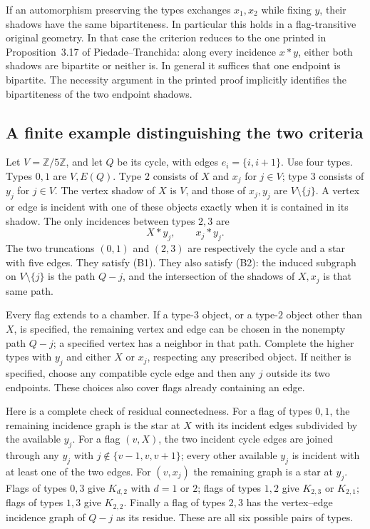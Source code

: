 \documentclass[11pt,a4paper]{article}
\begin{document}
If an automorphism preserving the types exchanges $x_1,x_2$ while
fixing $y$, their shadows have the same bipartiteness. In particular
this holds in a flag-transitive original geometry. In that case the
criterion reduces to the one printed in Proposition~3.17 of
Piedade--Tranchida: along every incidence $x*y$, either both shadows
are bipartite or neither is. In general it suffices that one endpoint
is bipartite. The necessity argument in the printed proof implicitly
identifies the bipartiteness of the two endpoint shadows.

\subsection*{A finite example distinguishing the two criteria}
Let $V=\mathbb Z/5\mathbb Z$, and let $Q$ be its cycle, with edges
$e_i=\{i,i+1\}$. Use four types. Types $0,1$ are $V,E(Q)$.
Type $2$ consists of $X$ and $x_j$ for $j\in V$; type $3$ consists
of $y_j$ for $j\in V$. The vertex shadow of $X$ is $V$, and those
of $x_j,y_j$ are $V\setminus\{j\}$. A vertex or edge is incident
with one of these objects exactly when it is contained in its shadow.
The only incidences between types $2,3$ are
\[
                          X*y_j,\qquad x_j*y_j.
\]
The two truncations $(0,1)$ and $(2,3)$ are respectively the cycle
and a star with five edges. They satisfy (B1). They also satisfy (B2):
the induced subgraph on $V\setminus\{j\}$ is the path $Q-j$, and
the intersection of the shadows of $X,x_j$ is that same path.

Every flag extends to a chamber. If a type-$3$ object, or a type-$2$
object other than $X$, is specified, the remaining vertex and edge
can be chosen in the nonempty path $Q-j$; a specified vertex has
a neighbor in that path. Complete the higher types with $y_j$ and
either $X$ or $x_j$, respecting any prescribed object. If neither
is specified, choose any compatible cycle
edge and then any $j$ outside its two endpoints. These choices also
cover flags already containing an edge.

Here is a complete check of residual connectedness. For a flag of
types $0,1$, the remaining incidence graph is the star at $X$ with
its incident edges subdivided by the available $y_j$. For a flag
$(v,X)$, the two incident cycle edges are joined through any $y_j$
with $j\notin\{v-1,v,v+1\}$; every other available $y_j$ is
incident with at least one of the two edges. For $(v,x_j)$ the
remaining graph is a star at $y_j$. Flags of types $0,3$ give
$K_{d,2}$ with $d=1$ or $2$; flags of types $1,2$ give $K_{2,3}$
or $K_{2,1}$; flags of types $1,3$ give $K_{2,2}$. Finally a flag
of types $2,3$ has the vertex--edge incidence graph of $Q-j$ as
its residue. These are all six possible pairs of types.
\end{document}

